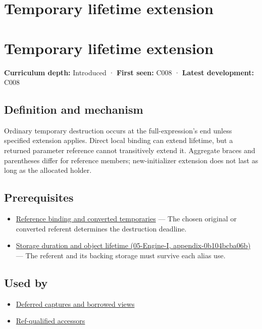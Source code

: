 \hypertarget{appendix-a978b29bbbb0}{}
\section*{Temporary lifetime extension}
\section{Temporary lifetime extension}\label{temporary-lifetime-extension}

\textbf{Curriculum depth:} Introduced · \textbf{First seen:} C008 · \textbf{Latest development:} C008

\subsection{Definition and mechanism}\label{definition-and-mechanism}

Ordinary temporary destruction occurs at the full-expression's end unless specified extension applies. Direct local binding can extend lifetime, but a returned parameter reference cannot transitively extend it. Aggregate braces and parentheses differ for reference members; new-initializer extension does not last as long as the allocated holder.

\subsection{Prerequisites}\label{prerequisites}

\begin{itemize}
\tightlist
\item
  \hyperref[appendix-37856d997bb0]{Reference binding and converted temporaries} --- The chosen original or converted referent determines the destruction deadline.
\item
  \href{}{Storage duration and object lifetime (05-Engine-I, appendix-0b104bcba06b)} --- The referent and its backing storage must survive each alias use.
\end{itemize}

\subsection{Used by}\label{used-by}

\begin{itemize}
\tightlist
\item
  \hyperref[appendix-aea529eb5175]{Deferred captures and borrowed views}
\item
  \hyperref[appendix-d42039b1d6f7]{Ref-qualified accessors}
\end{itemize}

